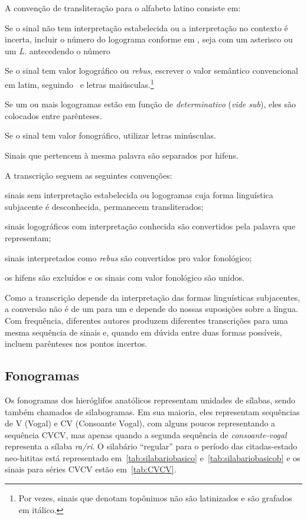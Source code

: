 \noindent A convenção de transliteração para o alfabeto latino consiste em:
\noprelistbreak%
\begin{compactenum}
	\item Se o sinal não tem interpretação estabelecida ou a interpretação no
		contexto é incerta, incluir o número do logograma conforme em
		\textcite{LarocheHH}, seja com um asterisco ou um \emph{L.} antecedendo o
		número
	\item Se o sinal tem valor logográfico ou \emph{rebus},
		escrever o valor semântico convencional em latim,
		seguindo~\textcite{LarocheHH} e letras maiúsculas.\footnote{Por vezes,
		sinais que denotam topônimos não são latinizados e são grafados em itálico.}
	\item Se um ou mais logogramas estão em função de \emph{determinativo}
		(\emph{vide sub}), eles são colocados entre parênteses.
	\item Se o sinal tem valor fonográfico, utilizar letras minúsculas.
	\item Sinais que pertencem à mesma palavra são separados por hifens.
\end{compactenum}
A transcrição seguem as seguintes convenções:
\begin{compactenum}
	\item sinais sem interpretação estabelecida ou logogramas cuja forma linguística
	subjacente é desconhecida, permanecem transliterados;
	\item sinais logográficos com interpretação conhecida são convertidos pela
	palavra que representam;
	\item sinais interpretados como \emph{rebus} são convertidos pro valor
	fonológico;
	\item os hifens são excluídos e os sinais com valor fonológico são unidos.
\end{compactenum}
Como a transcrição depende da interpretação das formas linguísticas subjacentes,
a conversão não é de um para um e depende do nossas suposições sobre a língua.
Com frequência, diferentes autores produzem diferentes transcrições para uma mesma
sequência de sinais e, quando em dúvida entre duas formas possíveis, incluem
parênteses nos pontos incertos.

\subsection{Fonogramas}

Os fonogramas dos hieróglifos anatólicos representam unidades de sílabas, sendo
também chamados de silabogramas.
Em sua maioria, eles representam sequências de V (Vogal) e CV (Consoante Vogal),
com alguns poucos representando a sequência CVCV, mas apenas quando a segunda 
sequência de \emph{consoante-vogal} representa a sílaba \emph{ra\slash{}ri}.\@
O silabário ``regular'' para o período das citadas-estado neo-hititas está 
representado em~\autoref{tab:silabariobasico} e~\autoref{tab:silabariobasicob} e
os sinais para séries CVCV estão em~\autoref{tab:CVCV}.

